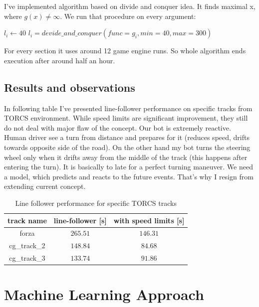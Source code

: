 \documentclass[declaration,shortabstract,english,inz]{iithesis}
\begin{document}
I've implemented algorithm based on divide and conquer idea. It finds maximal x, where $g(x) \neq \infty$. We run that procedure on every argument:

\begin{algorithmic}
    \STATE $l_i\gets 40$
        \STATE $l_i = devide\_and\_conquer(func=g_i, min=40, max=300)$
    \ENDFOR
\end{algorithmic}

For every section it uses around 12 game engine runs. So whole algorithm ends execution after around half an hour.

\section{Results and observations}

In following table I've presented line-follower performance on specific tracks from TORCS environment. While speed limits are significant improvement, they still do not deal with major flaw of the concept. Our bot is extremely reactive. Human driver see a turn from distance and prepares for it (reduces speed, drifts towards opposite side of the road). On the other hand my bot turns the steering wheel only when it drifts away from the middle of the track (this happens after entering the turn). It is basically to late for a perfect turning maneuver. We need a model, which predicts and reacts to the  future events. That's why I resign from extending current concept.


\begin{table}[h]
    \centering
    \begin{tabular}{ |c|c|c|}
          \hline
          track name & line-follower [s] & with speed limits [s] \\
          \hline
          forza & $265.51$ & $146.31$  \\
          \hline
          cg\_track\_2 & $148.84$ &  $84.68$\\
          \hline
          cg\_track\_3 & $133.74$ & $91.86$ \\
          \hline
        \end{tabular}
        \caption{Line follower performance for specific TORCS tracks}
        \label{tab:line_follower}

\end{table}

\chapter{Machine Learning Approach}
\end{document}
